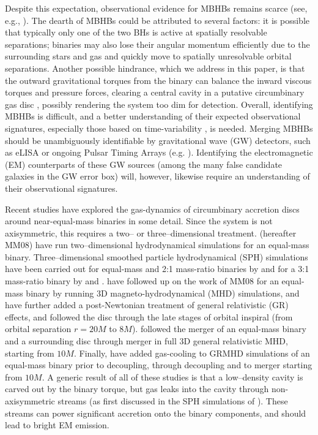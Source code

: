 Despite this expectation, observational evidence for MBHBs remains
scarce (see, e.g., \citealt{Komossa:Rev06,Tsalmantza:2011, Eracleous:2011}).
The dearth
of MBHBs could be attributed to several factors: it is possible that
typically only one of the two BHs is active at spatially resolvable
separations; binaries may also lose their angular momentum efficiently
due to the surrounding stars and gas and quickly move to spatially
unresolvable orbital separations.  Another possible hindrance, which
we address in this paper, is that the outward gravitational torques
from the binary can balance the inward viscous torques and pressure forces, 
clearing a central cavity in a putative circumbinary gas disc 
\citep{AL94}, possibly rendering the system too dim for
detection.  Overall, identifying MBHBs is difficult, and a better
understanding of their expected observational signatures, especially
those based on time-variability \citep{Haiman+2009}, is
needed. Merging MBHBs should be unambiguously identifiable by
gravitational wave (GW) detectors, such as eLISA \citep{eLISA:AmaroSeoane:2013} or
ongoing Pulsar Timing Arrays (e.g. \citealt{PTAs}).  Identifying the
electromagnetic (EM) counterparts of these GW sources (among the many
false candidate galaxies in the GW error box) will, however, likewise
require an understanding of their observational signatures.

Recent studies have explored the gas-dynamics of circumbinary accretion
discs around near-equal-mass binaries in some detail.  Since the
system is not axisymmetric, this requires a two-- or
three--dimensional treatment.  \cite{MacFadyen:2008} (hereafter MM08)
have run two--dimensional hydrodynamical simulations for an equal-mass
binary. Three--dimensional smoothed particle hydrodynamical (SPH)
simulations have been carried out for equal-mass and 2:1 mass-ratio
binaries by \cite{Hayasaki:2007} and for a 3:1 mass-ratio binary by
\cite{Cuadra:2009} and \cite{Roedig:2012:Trqs}.
\cite{ShiKrolik:2012} have followed up on the work of MM08 for an
equal-mass binary by running 3D magneto-hydrodynamical (MHD)
simulations, and \cite{Noble+2012} have further added a post-Newtonian
treatment of general relativistic (GR) effects, and followed the disc
through the late stages of orbital inspiral (from orbital separation
$r=20M$ to $8M$).  \cite{FarrisShap:2011} followed the merger of an
equal-mass binary and a surrounding disc through merger in full 3D
general relativistic MHD, starting from $10M$. Finally,
\cite{FarrisGold:2012} have added gas-cooling to GRMHD simulations of an
equal-mass binary prior to decoupling, through decoupling and to
merger starting from $10M$.  A generic result of all of these studies
is that a low--density cavity is carved out by the binary torque, but
gas leaks into the cavity through non-axisymmetric streams 
(as first discussed in the SPH simulations of \citealt{ArtyLubow:1996}).  These
streams can power significant accretion onto the binary components,
and should lead to bright EM emission.

